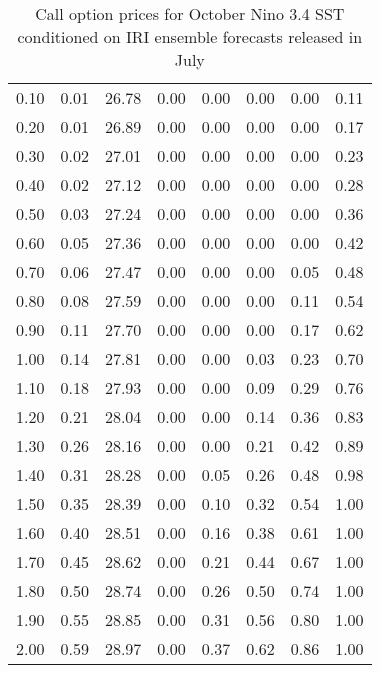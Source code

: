 \begin{table*}[ht]
\begin{tabular}{rrrrrrrr}
  0.10 & 0.01 & 26.78 & 0.00 & 0.00 & 0.00 & 0.00 & 0.11 \\ 
  0.20 & 0.01 & 26.89 & 0.00 & 0.00 & 0.00 & 0.00 & 0.17 \\ 
  0.30 & 0.02 & 27.01 & 0.00 & 0.00 & 0.00 & 0.00 & 0.23 \\ 
  0.40 & 0.02 & 27.12 & 0.00 & 0.00 & 0.00 & 0.00 & 0.28 \\ 
  0.50 & 0.03 & 27.24 & 0.00 & 0.00 & 0.00 & 0.00 & 0.36 \\ 
  0.60 & 0.05 & 27.36 & 0.00 & 0.00 & 0.00 & 0.00 & 0.42 \\ 
  0.70 & 0.06 & 27.47 & 0.00 & 0.00 & 0.00 & 0.05 & 0.48 \\ 
  0.80 & 0.08 & 27.59 & 0.00 & 0.00 & 0.00 & 0.11 & 0.54 \\ 
  0.90 & 0.11 & 27.70 & 0.00 & 0.00 & 0.00 & 0.17 & 0.62 \\ 
  1.00 & 0.14 & 27.81 & 0.00 & 0.00 & 0.03 & 0.23 & 0.70 \\ 
  1.10 & 0.18 & 27.93 & 0.00 & 0.00 & 0.09 & 0.29 & 0.76 \\ 
  1.20 & 0.21 & 28.04 & 0.00 & 0.00 & 0.14 & 0.36 & 0.83 \\ 
  1.30 & 0.26 & 28.16 & 0.00 & 0.00 & 0.21 & 0.42 & 0.89 \\ 
  1.40 & 0.31 & 28.28 & 0.00 & 0.05 & 0.26 & 0.48 & 0.98 \\ 
  1.50 & 0.35 & 28.39 & 0.00 & 0.10 & 0.32 & 0.54 & 1.00 \\ 
  1.60 & 0.40 & 28.51 & 0.00 & 0.16 & 0.38 & 0.61 & 1.00 \\ 
  1.70 & 0.45 & 28.62 & 0.00 & 0.21 & 0.44 & 0.67 & 1.00 \\ 
  1.80 & 0.50 & 28.74 & 0.00 & 0.26 & 0.50 & 0.74 & 1.00 \\ 
  1.90 & 0.55 & 28.85 & 0.00 & 0.31 & 0.56 & 0.80 & 1.00 \\ 
  2.00 & 0.59 & 28.97 & 0.00 & 0.37 & 0.62 & 0.86 & 1.00 \\ 
   \hline
\end{tabular}
\caption{Call option prices for October Nino 3.4 SST conditioned on IRI ensemble forecasts released in July} 
\end{table*}

